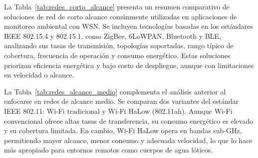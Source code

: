 La Tabla~\ref{tab:redes_corto_alcance} presenta un resumen comparativo de soluciones de red de corto alcance comúnmente utilizadas en aplicaciones de monitoreo ambiental con WSN. Se incluyen tecnologías basadas en los estándares IEEE 802.15.4 y 802.15.1, como ZigBee, 6LoWPAN, Bluetooth y BLE, analizando sus tasas de transmisión, topologías soportadas, rango típico de cobertura, frecuencia de operación y consumo energético. Estas soluciones priorizan eficiencia energética y bajo costo de despliegue, aunque con limitaciones en velocidad o alcance.

\begin{table}[H]
\centering
\caption{Resumen de soluciones de red de corto alcance \cite{lopez2023}}
\label{tab:redes_corto_alcance}
\renewcommand{\arraystretch}{1.3}
\end{table}

La Tabla~\ref{tab:redes_alcance_medio} complementa el análisis anterior al enfocarse en redes de alcance medio. Se comparan dos variantes del estándar IEEE 802.11: Wi-Fi tradicional y Wi-Fi HaLow (802.11ah). Aunque Wi-Fi convencional ofrece altas tasas de transferencia, su consumo energético es elevado y su cobertura limitada. En cambio, Wi-Fi HaLow opera en bandas sub-GHz, permitiendo mayor alcance, menor consumo y adecuada velocidad, lo que lo hace más apropiado para entornos remotos como cuerpos de agua lóticos.

